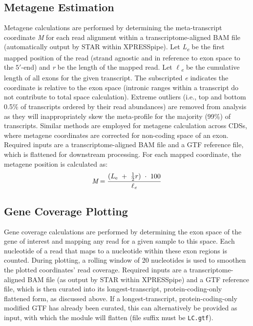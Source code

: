 \documentclass[10pt, oneside]{article}
\begin{document}
\subsection*{Metagene Estimation}
Metagene calculations are performed by determining the meta-transcript coordinate \textit{M} for each read alignment within a transcriptome-aligned BAM file (automatically output by STAR within XPRESSpipe). Let \textit{L\textsubscript{e}} be the first mapped position of the read (strand agnostic and in reference to exon space to the $5'$-end) and \textit{r} be the length of the mapped read. Let \textit{$\ell$\textsubscript{e}} be the cumulative length of all exons for the given transcript. The subscripted \textit{e} indicates the coordinate is relative to the exon space (intronic ranges within a transcript do not contribute to total space calculation). Extreme outliers (i.e., top and bottom 0.5\% of transcripts ordered by their read abundances) are removed from analysis as they will inappropriately skew the meta-profile for the majority (99\%) of transcripts. Similar methods are employed for metagene calculation across CDSs, where metagene coordinates are corrected for non-coding space of an exon. Required inputs are a transcriptome-aligned BAM file and a GTF reference file, which is flattened for downstream processing. For each mapped coordinate, the metagene position is calculated as:
\begin{equation}
\textit{M} = \frac{(L\textsubscript{e}\ +\ \frac{1}{2}r)\ \cdot\ 100}{\textit{$\ell$\textsubscript{e}}}
\end{equation}

\subsection*{Gene Coverage Plotting}
Gene coverage calculations are performed by determining the exon space of the gene of interest and mapping any read for a given sample to this space. Each nucleotide of a read that maps to a nucleotide within these exon regions is counted. During plotting, a rolling window of 20 nucleotides is used to smoothen the plotted coordinates' read coverage. Required inputs are a transcriptome-aligned BAM file (as output by STAR within XPRESSpipe) and a GTF reference file, which is then curated into its longest-transcript, protein-coding-only flattened form, as discussed above. If a longest-transcript, protein-coding-only modified GTF has already been curated, this can alternatively be provided as input, with which the module will flatten (file suffix must be \texttt{LC.gtf}).\\
\end{document}
